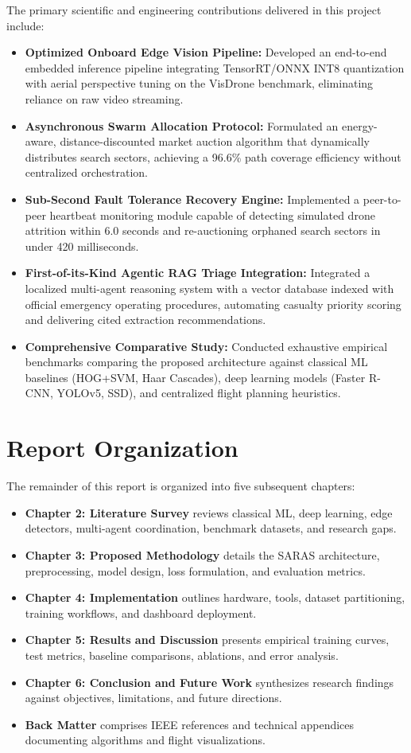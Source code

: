 The primary scientific and engineering contributions delivered in this project include:
\begin{itemize}
    \item \textbf{Optimized Onboard Edge Vision Pipeline:} Developed an end-to-end embedded inference pipeline integrating TensorRT/ONNX INT8 quantization with aerial perspective tuning on the VisDrone benchmark, eliminating reliance on raw video streaming.
    \item \textbf{Asynchronous Swarm Allocation Protocol:} Formulated an energy-aware, distance-discounted market auction algorithm that dynamically distributes search sectors, achieving a 96.6\% path coverage efficiency without centralized orchestration.
    \item \textbf{Sub-Second Fault Tolerance Recovery Engine:} Implemented a peer-to-peer heartbeat monitoring module capable of detecting simulated drone attrition within 6.0 seconds and re-auctioning orphaned search sectors in under 420 milliseconds.
    \item \textbf{First-of-its-Kind Agentic RAG Triage Integration:} Integrated a localized multi-agent reasoning system with a vector database indexed with official emergency operating procedures, automating casualty priority scoring and delivering cited extraction recommendations.
    \item \textbf{Comprehensive Comparative Study:} Conducted exhaustive empirical benchmarks comparing the proposed architecture against classical ML baselines (HOG+SVM, Haar Cascades), deep learning models (Faster R-CNN, YOLOv5, SSD), and centralized flight planning heuristics.
\end{itemize}

\section{Report Organization}

The remainder of this report is organized into five subsequent chapters:
\begin{itemize}\itemsep=1pt \topsep=1pt
    \item \textbf{Chapter 2: Literature Survey} reviews classical ML, deep learning, edge detectors, multi-agent coordination, benchmark datasets, and research gaps.
    \item \textbf{Chapter 3: Proposed Methodology} details the SARAS architecture, preprocessing, model design, loss formulation, and evaluation metrics.
    \item \textbf{Chapter 4: Implementation} outlines hardware, tools, dataset partitioning, training workflows, and dashboard deployment.
    \item \textbf{Chapter 5: Results and Discussion} presents empirical training curves, test metrics, baseline comparisons, ablations, and error analysis.
    \item \textbf{Chapter 6: Conclusion and Future Work} synthesizes research findings against objectives, limitations, and future directions.
    \item \textbf{Back Matter} comprises IEEE references and technical appendices documenting algorithms and flight visualizations.
\end{itemize}
